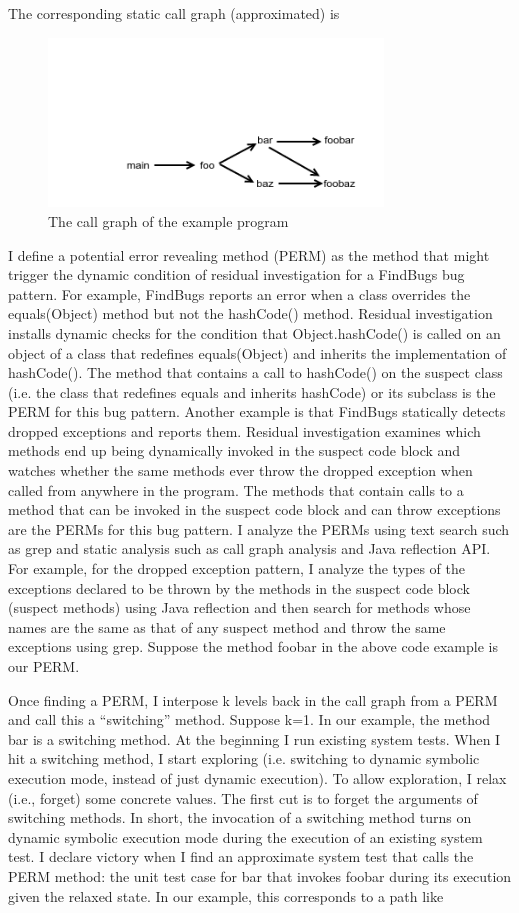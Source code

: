 \documentclass[proposal]{umthesis} %
\begin{document}
The corresponding static call graph (approximated) is
\begin{figure}[h]
\centering
\includegraphics[width=3.5in, trim=0.8in 0in 0in 1.0in, clip]{callgraph.png}
\caption{The call graph of the example program}
\end{figure}

I define a potential error revealing method (PERM) as the method that might trigger the dynamic condition of residual investigation for a FindBugs bug pattern.  For example, FindBugs reports an error when a class overrides the equals(Object) method but not the hashCode() method.  Residual investigation installs dynamic checks for the condition that Object.hashCode() is called on an object of a class that redefines equals(Object) and inherits the implementation of hashCode(). The method that contains a call to hashCode() on the suspect class (i.e. the class that redefines equals and inherits hashCode) or its subclass is the PERM for this bug pattern.  Another example is that FindBugs statically detects dropped exceptions and reports them.  Residual investigation examines which methods end up being dynamically invoked in the suspect code block and watches whether the same methods ever throw the dropped exception when called from anywhere in the program. The methods that contain calls to a method that can be invoked in the suspect code block and can throw exceptions are the PERMs for this bug pattern. I analyze the PERMs using text search such as grep and static analysis such as call graph analysis and Java reflection API.  For example, for the dropped exception pattern, I analyze the types of the exceptions declared to be thrown by the methods in the suspect code block (suspect methods) using Java reflection and then search for methods whose names are the same as that of any suspect method and throw the same exceptions using grep.  Suppose the method foobar in the above code example is our PERM.  

Once finding a PERM, I interpose k levels back in the call graph from a PERM and call this a “switching” method.  Suppose k=1. In our example, the method bar is a switching method.  At the beginning I run existing system tests.  When I hit a switching method, I start exploring (i.e. switching to dynamic symbolic execution mode, instead of just dynamic execution).  To allow exploration, I relax (i.e., forget) some concrete values.  The first cut is to forget the arguments of switching methods.  In short, the invocation of a switching method turns on dynamic symbolic execution mode during the execution of an existing system test.  I declare victory when I find an approximate system test that calls the PERM method: the unit test case for bar that invokes foobar during its execution given the relaxed state.  In our example, this corresponds to a path like 
\end{document}
